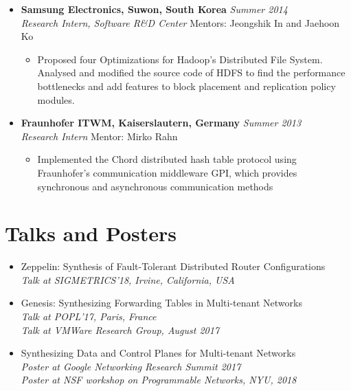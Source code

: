 \documentclass[11pt,a4paper,sans]{moderncv}        %
\begin{document}
\begin{itemize}
	\item \textbf{Samsung Electronics, Suwon, South Korea} \hfill \emph{Summer 2014} \\
	\emph{Research Intern, Software R\&D Center} \hfill Mentors: Jeongshik In and Jaehoon Ko
	\begin{itemize}
		\item Proposed four Optimizations for Hadoop's Distributed File System. Analysed and 
		modified the source code of HDFS to find the performance bottlenecks and add features to 
		block placement and replication policy modules.
	\end{itemize}
	\vspace*{6pt}
	\item \textbf{Fraunhofer ITWM, Kaiserslautern, Germany} \hfill \emph{Summer 2013} \\
	\emph{Research Intern} \hfill Mentor: Mirko Rahn
		\begin{itemize}
			\item Implemented the Chord distributed hash table protocol using Fraunhofer's communication middleware GPI, which provides
			synchronous and asynchronous communication methods
		\end{itemize}
	
\end{itemize}

\vspace{2pt}

\section{Talks and Posters}
\begin{itemize}
\item Zeppelin: Synthesis of Fault-Tolerant Distributed Router Configurations \\
\emph{Talk at SIGMETRICS'18, Irvine, California, USA} 

\item Genesis: Synthesizing Forwarding Tables in Multi-tenant Networks \\
\emph{Talk at POPL'17, Paris, France} \\
\emph{Talk at VMWare Research Group, August 2017}

\item Synthesizing Data and Control Planes for Multi-tenant Networks \\
\emph{Poster at Google Networking Research Summit 2017} \\
\emph{Poster at NSF workshop on Programmable Networks, NYU, 2018}
\end{itemize}
\end{document}
